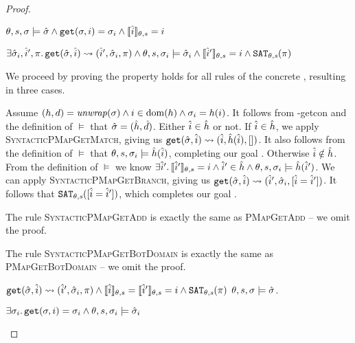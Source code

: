 \begin{proof}


\pfassume \begin{hypvlist}
 $\theta,s,\sigma \models \hat{\sigma} \land \texttt{get}(\sigma, i)=\sigma_i \land \llbracket\hat{i}\rrbracket_{\theta,s}=i$
\end{hypvlist}
\pfprove \begin{goalvlist}
 $\exists \hat{\sigma}_i, \hat{i}', \pi \ldotp \texttt{get}(\hat{\sigma},\hat{i})\rightsquigarrow(\hat{i}', \hat{\sigma}_i, \pi) \land \theta,s,\sigma_i\models\hat{\sigma}_i \land \llbracket\hat{i}'\rrbracket_{\theta,s}=i \land \texttt{SAT}_{\mathit{\theta,s}}(\pi)$
\end{goalvlist}

We proceed by proving the property holds for all rules of the concrete , resulting in three cases.


\begin{hypvlist}
 Assume $(h,d)={\operatorname{\mathit{unwrap}}}(\sigma) \land i\in\operatorname{dom}(h) \land \sigma_{i}=h(i)$.
 It follows from \hyp{getcon} and the definition of $\models$ that $\hat{\sigma}=(\hat{h}, \hat{d})$.
 Either $\hat{i}\in\hat{h}$ or not. If $\hat{i}\in \hat{h}$, we apply \textsc{SyntacticPMapGetMatch}, giving us $\texttt{get}(\hat{\sigma},\hat{i})\rightsquigarrow(\hat{i}, \hat{h}(\hat{i}), [])$. It also follows from the definition of $\models$ that ${\theta,s,\sigma_i\models\hat{h}(\hat{i})}$, completing our goal .
 Otherwise $\hat{i}\notin \hat{h}$. From the definition of $\models$ we know $\exists \hat{i}'\ldotp \llbracket\hat{i}'\rrbracket_{\theta,s}=i\land \hat{i}'\in\hat{h} \land {\theta,s,\sigma_i\models \hat{h}(\hat{i}')}$. We can apply \textsc{SyntacticPMapGetBranch}, giving us $\texttt{get}(\hat{\sigma},\hat{i})\rightsquigarrow(\hat{i}',\hat{\sigma}_i, [\hat{i}=\hat{i}'])$. It follows that $\texttt{SAT}_{\mathit{\theta,s}}([\hat{i} = \hat{i}'])$, which completes our goal .
\end{hypvlist}

The rule \textsc{SyntacticPMapGetAdd} is exactly the same as \textsc{PMapGetAdd} -- we omit the proof.

The rule \textsc{SyntacticPMapGetBotDomain} is exactly the same as \textsc{PMapGetBotDomain} -- we omit the proof.


\pfassume \begin{hypvlist}
 $\texttt{get}(\hat{\sigma},\hat{i})\rightsquigarrow(\hat{i}', \hat{\sigma}_i, \pi) \land \llbracket\hat{i}\rrbracket_{\theta,s}=\llbracket\hat{i}'\rrbracket_{\theta,s}=i \land \texttt{SAT}_{\mathit{\theta,s}}(\pi) $
 $\theta,s,\sigma\models\hat{\sigma}$.
\end{hypvlist}
\pfprove \begin{goalvlist}
 $\exists \sigma_i \ldotp \texttt{get}(\sigma, i)=\sigma_i \land \theta,s,\sigma_i \models \hat{\sigma}_i$
\end{goalvlist}


\end{proof}
